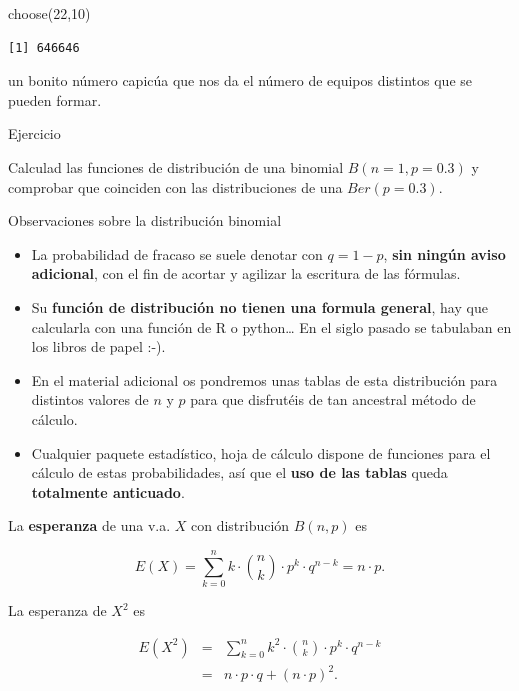 \documentclass[
  letterpaper,
  DIV=11,
  numbers=noendperiod]{scrreprt}
\newenvironment{Shaded}{\begin{snugshade}}{\end{snugshade}}
\newcommand{\DecValTok}[1]{\textcolor[rgb]{0.68,0.00,0.00}{#1}}
\newcommand{\FunctionTok}[1]{\textcolor[rgb]{0.28,0.35,0.67}{#1}}
\newcommand{\NormalTok}[1]{\textcolor[rgb]{0.00,0.23,0.31}{#1}}
\providecommand{\tightlist}{%
  \setlength{\itemsep}{0pt}\setlength{\parskip}{0pt}}\usepackage{longtable,booktabs,array}
\begin{document}
\begin{Shaded}
\begin{Highlighting}[]
\FunctionTok{choose}\NormalTok{(}\DecValTok{22}\NormalTok{,}\DecValTok{10}\NormalTok{)}
\end{Highlighting}
\end{Shaded}

\begin{verbatim}
[1] 646646
\end{verbatim}

un bonito número capicúa que nos da el número de equipos distintos que
se pueden formar.

Ejercicio

Calculad las funciones de distribución de una binomial \(B(n=1,p=0.3)\)
y comprobar que coinciden con las distribuciones de una \(Ber(p=0.3)\).

Observaciones sobre la distribución binomial

\begin{itemize}
\tightlist
\item
  La probabilidad de fracaso se suele denotar con \(q=1-p\), \textbf{sin
  ningún aviso adicional}, con el fin de acortar y agilizar la escritura
  de las fórmulas.
\item
  Su \textbf{función de distribución no tienen una formula general}, hay
  que calcularla con una función de R o python\ldots{} En el siglo
  pasado se tabulaban en los libros de papel :-).
\item
  En el material adicional os pondremos unas tablas de esta distribución
  para distintos valores de \(n\) y \(p\) para que disfrutéis de tan
  ancestral método de cálculo.
\item
  Cualquier paquete estadístico, hoja de cálculo dispone de funciones
  para el cálculo de estas probabilidades, así que el \textbf{uso de las
  tablas} queda \textbf{totalmente anticuado}.
\end{itemize}

La \textbf{esperanza} de una v.a. \(X\) con distribución \(B(n,p)\) es

\[E(X)=\displaystyle\sum_{k=0}^n k \cdot  {n \choose k }\cdot p^k\cdot q^{n-k} = n\cdot p.\]

La esperanza de \(X^2\) es

\begin{eqnarray*}
E(X^2)&=& \displaystyle\sum_{k=0}^n k^2 \cdot  {n \choose k }\cdot p^k\cdot q^{n-k}\\
&=& n\cdot p\cdot q+(n\cdot p)^2.
\end{eqnarray*}
\end{document}
